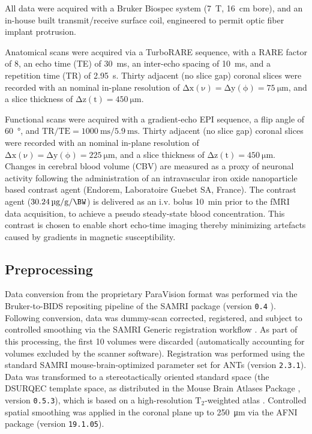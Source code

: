 All data were acquired with a Bruker Biospec system (\SI{7}{\tesla}, \SI{16}{\centi\meter} bore), and an in-house built transmit/receive surface coil, engineered to permit optic fiber implant protrusion.

Anatomical scans were acquired via a TurboRARE sequence, with a RARE factor of 8, an echo time (TE) of \SI{30}{\milli\second}, an inter-echo spacing of \SI{10}{\milli\second}, and a repetition time (TR) of \SI{2.95}{\second}.
Thirty adjacent (no slice gap) coronal slices were recorded with an nominal in-plane resolution of $\mathrm{\Delta x(\nu)=\Delta y(\phi)=\SI{75}{\micro\meter}}$, and a slice thickness of $\mathrm{\Delta z(t)=\SI{450}{\micro\meter}}$.

Functional scans were acquired with a gradient-echo EPI sequence, a flip angle of \SI{60}{\degree}, and $\mathrm{TR/TE = \SI{1000}{\milli\second}/\SI{5.9}{\milli\second}}$.
Thirty adjacent (no slice gap) coronal slices were recorded with an nominal in-plane resolution of $\mathrm{\Delta x(\nu)=\Delta y(\phi)=\SI{225}{\micro\meter}}$, and a slice thickness of $\mathrm{\Delta z(t)=\SI{450}{\micro\meter}}$.
Changes in cerebral blood volume (CBV) are measured as a proxy of neuronal activity following the administration of an intravascular iron oxide nanoparticle based contrast agent (Endorem, Laboratoire Guebet SA, France).
The contrast agent ($\SI{30.24}{\micro\gram\per\gram\per\BW}$) is delivered as an i.v. bolus \SI{10}{\minute} prior to the fMRI data acquisition, to achieve a pseudo steady-state blood concentration.
This contrast is chosen to enable short echo-time imaging thereby minimizing artefacts caused by gradients in magnetic susceptibility.

\subsection{Preprocessing}

Data conversion from the proprietary ParaVision format was performed via the Bruker-to-BIDS repositing pipeline \cite{aowsis} of the SAMRI package (version \textcolor{mg}{\texttt{0.4}} \cite{samri}).
Following conversion, data was dummy-scan corrected, registered, and subject to controlled smoothing via the SAMRI Generic registration workflow \cite{irsabi}.
As part of this processing, the first 10 volumes were discarded (automatically accounting for volumes excluded by the scanner software).
Registration was performed using the standard SAMRI mouse-brain-optimized parameter set for ANTs \cite{ants} (version \textcolor{mg}{\texttt{2.3.1}}).
Data was transformed to a stereotactically oriented standard space (the DSURQEC template space, as distributed in the Mouse Brain Atlases Package \cite{atlases_generator}, version \textcolor{mg}{\texttt{0.5.3}}), which is based on a high-resolution $\mathrm{T_2}$-weighted atlas \cite{dsu1}.
Controlled spatial smoothing was applied in the coronal plane up to \SI{250}{\micro\meter} via the AFNI package \cite{afni} (version \textcolor{mg}{\texttt{19.1.05}}).

